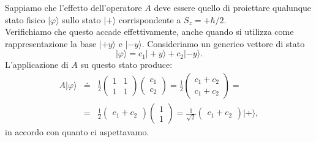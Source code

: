 Sappiamo che l'effetto dell'operatore $A$ deve essere quello di proiettare qualunque stato fisico $| \varphi \rangle $ sullo stato $| + \rangle $ corrispondente a $S_z=+\hbar/2$.\\
Verifichiamo che questo accade effettivamente, anche quando si utilizza come rappresentazione la base $| +y \rangle $ e $| -y \rangle $. Consideriamo un generico vettore di stato
	\begin{equation}
		| \varphi \rangle = c_1 | +y \rangle + c_2| -y \rangle .
	\end{equation}
L'applicazione di $A$ su questo stato produce:
	\begin{eqnarray}
		A | \varphi \rangle &\doteq & \frac{1}{2}
		\begin{pmatrix}
		1 & 1\\
		1 & 1
		\end{pmatrix}
		\begin{pmatrix}
		c_1\\
		c_2
		\end{pmatrix}=
		\frac{1}{2}
		\begin{pmatrix}
		c_1+c_2\\
		c_1+c_2
		\end{pmatrix}=\nonumber \\
		&=& \frac{1}{2}
		\begin{pmatrix}
		c_1 + c_2
		\end{pmatrix}
		\begin{pmatrix}
		1\\
		1
		\end{pmatrix}=
		\frac{1}{\sqrt{2}}
		\begin{pmatrix}
		c_1 + c_2
			\end{pmatrix}
		| + \rangle ,
	\end{eqnarray}
in accordo con quanto ci aspettavamo.
